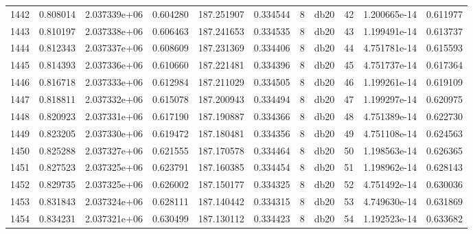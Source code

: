 \begin{tabular}{lrrrrrrlrrr}
1442 &    0.808014 &        2.037339e+06 &  0.604280 &              187.251907 &    0.334544 &       8 &         db20 &     42 &   1.200665e-14 &      0.611977 \\
1443 &    0.810197 &        2.037338e+06 &  0.606463 &              187.241653 &    0.334535 &       8 &         db20 &     43 &   1.199491e-14 &      0.613737 \\
1444 &    0.812343 &        2.037337e+06 &  0.608609 &              187.231369 &    0.334406 &       8 &         db20 &     44 &   4.751781e-14 &      0.615593 \\
1445 &    0.814393 &        2.037336e+06 &  0.610660 &              187.221481 &    0.334396 &       8 &         db20 &     45 &   4.751737e-14 &      0.617364 \\
1446 &    0.816718 &        2.037333e+06 &  0.612984 &              187.211029 &    0.334505 &       8 &         db20 &     46 &   1.199261e-14 &      0.619109 \\
1447 &    0.818811 &        2.037332e+06 &  0.615078 &              187.200943 &    0.334494 &       8 &         db20 &     47 &   1.199297e-14 &      0.620975 \\
1448 &    0.820923 &        2.037331e+06 &  0.617190 &              187.190887 &    0.334366 &       8 &         db20 &     48 &   4.751389e-14 &      0.622730 \\
1449 &    0.823205 &        2.037330e+06 &  0.619472 &              187.180481 &    0.334356 &       8 &         db20 &     49 &   4.751108e-14 &      0.624563 \\
1450 &    0.825288 &        2.037327e+06 &  0.621555 &              187.170578 &    0.334464 &       8 &         db20 &     50 &   1.198563e-14 &      0.626365 \\
1451 &    0.827523 &        2.037325e+06 &  0.623791 &              187.160385 &    0.334454 &       8 &         db20 &     51 &   1.198962e-14 &      0.628143 \\
1452 &    0.829735 &        2.037325e+06 &  0.626002 &              187.150177 &    0.334325 &       8 &         db20 &     52 &   4.751492e-14 &      0.630036 \\
1453 &    0.831843 &        2.037324e+06 &  0.628111 &              187.140442 &    0.334315 &       8 &         db20 &     53 &   4.749630e-14 &      0.631869 \\
1454 &    0.834231 &        2.037321e+06 &  0.630499 &              187.130112 &    0.334423 &       8 &         db20 &     54 &   1.192523e-14 &      0.633682 \\

\end{tabular}
